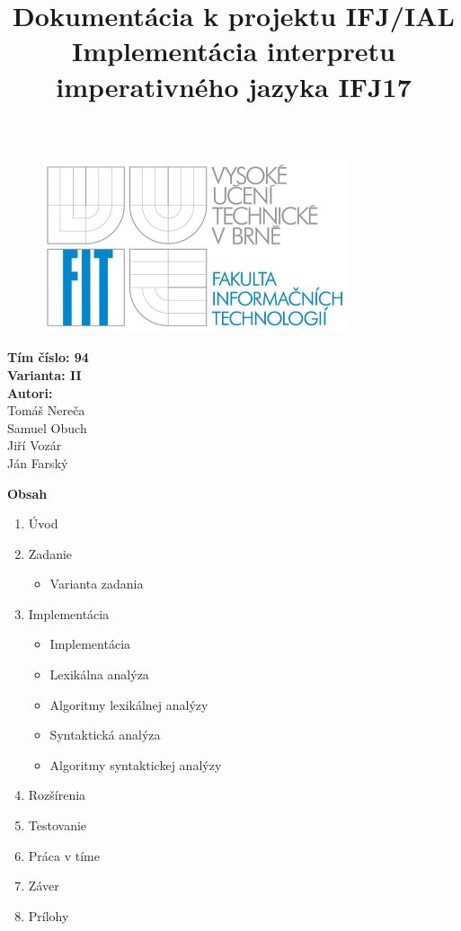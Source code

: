\documentclass{article}
\author{}
\title{Dokumentácia k projektu IFJ/IAL
\textbf{Implementácia interpretu imperativného jazyka IFJ17} 
}
\begin{document}
\begin{figure}[h!]
\centering
\includegraphics{FITlogo.jpg}
\maketitle
\end{figure}

\vspace{3cm}

\noindent
\large{\textbf{Tím číslo: 94}}
\\
\large{\textbf{Varianta: II}}
\\
\large{\textbf{Autori:}} 
\\
Tomáš Nereča \\
Samuel Obuch \\
Jiří Vozár \\
Ján Farský \\

\vspace{7cm}

\textbf{ \Huge{Obsah} }

\begin{enumerate}
    \item \LARGE{Úvod} 
    \item \LARGE{Zadanie} 
        \begin{itemize}
            \item Varianta zadania
        \end{itemize}
    \item \LARGE{Implementácia} 
        \begin{itemize}
            \item Implementácia
            \item Lexikálna analýza
            \item Algoritmy lexikálnej analýzy
            \item Syntaktická analýza
            \item Algoritmy syntaktickej analýzy
        \end{itemize}
    \item \LARGE{Rozšírenia} 
    \item \LARGE{Testovanie} 
    \item \LARGE{Práca v tíme} 
    \item \LARGE{Záver} 
    \item \LARGE{Prílohy} 
\end{enumerate}
\end{document}
